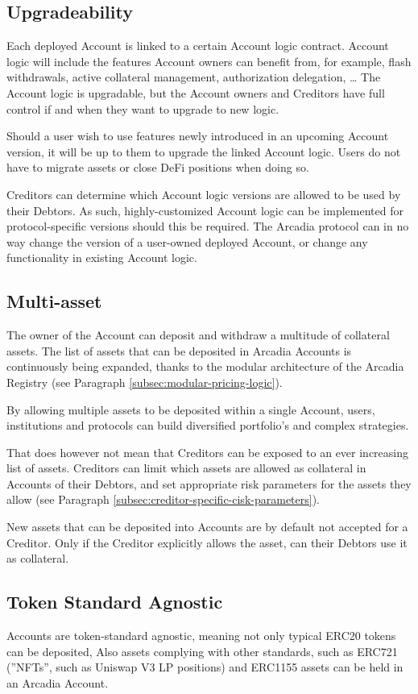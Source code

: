 \documentclass[sigconf,nonacm]{acmart}
\begin{document}
\subsection{Upgradeability}
Each deployed Account is linked to a certain Account logic contract.
Account logic will include the features Account owners can benefit from, for example, flash withdrawals, active collateral management, authorization delegation, … 
The Account logic is upgradable, but the Account owners and Creditors have full control if and when they want to upgrade to new logic.

Should a user wish to use features newly introduced in an upcoming Account version, it will be up to them to upgrade the linked Account logic.
Users do not have to migrate assets or close DeFi positions when doing so.

Creditors can determine which Account logic versions are allowed to be used by their Debtors.
As such, highly-customized Account logic can be implemented for protocol-specific versions should this be required. 
The Arcadia protocol can in no way change the version of a user-owned deployed Account, or change any functionality in existing Account logic.

\subsection{Multi-asset}
\label{subsec:multi-asset}
The owner of the Account can deposit and withdraw a multitude of collateral assets.
The list of assets that can be deposited in Arcadia Accounts is continuously being expanded, thanks to the modular architecture of the Arcadia Registry (see Paragraph \ref{subsec:modular-pricing-logic}).

By allowing multiple assets to be deposited within a single Account, users, institutions and protocols can build diversified portfolio's and complex strategies.

That does however not mean that Creditors can be exposed to an ever increasing list of assets.
Creditors can limit which assets are allowed as collateral in Accounts of their Debtors,
and set appropriate risk parameters for the assets they allow (see Paragraph \ref{subsec:creditor-specific-cisk-parameters}).

New assets that can be deposited into Accounts are by default not accepted for a Creditor.
Only if the Creditor explicitly allows the asset, can their Debtors use it as collateral.

\subsection{Token Standard Agnostic}
Accounts are token-standard agnostic, meaning not only typical ERC20 tokens can be deposited,
Also assets complying with other standards, such as ERC721 (”NFTs”, such as Uniswap V3 LP positions) and ERC1155 assets can be held in an Arcadia Account.
\end{document}
